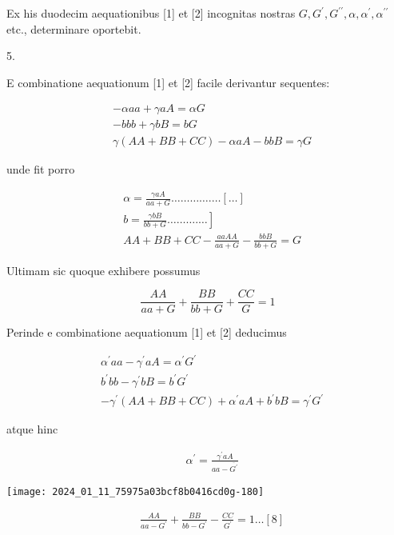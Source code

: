 \documentclass[10pt]{article}
\begin{document}
Ex his duodecim aequationibus [1] et [2] incognitas nostras \(G, G^{\prime}, G^{\prime \prime}, \alpha, \alpha^{\prime}, \alpha^{\prime \prime}\) etc., determinare oportebit.

5.

E combinatione aequationum [1] et [2] facile derivantur sequentes:

\[
\begin{aligned}
& -\alpha a a+\gamma a A=\alpha G \\
& -b b b+\gamma b B=b G \\
& \gamma(A A+B B+C C)-\alpha a A-b b B=\gamma G
\end{aligned}
\]

unde fit porro

\[
\begin{aligned}
& \alpha=\frac{\gamma a A}{a a+G} \ldots \ldots \ldots \ldots . \ldots[\ldots] \\
& \left.b=\frac{\gamma b B}{b b+G} \ldots \ldots \ldots . \ldots\right] \\
& A A+B B+C C-\frac{a a A A}{a a+G}-\frac{b b B}{b b+G}=G
\end{aligned}
\]

Ultimam sic quoque exhibere possumus

\[
\frac{A A}{a a+G}+\frac{B B}{b b+G}+\frac{C C}{G}=1
\]

Perinde e combinatione aequationum [1] et [2] deducimus

\[
\begin{aligned}
& \alpha^{\prime} a a-\gamma^{\prime} a A=\alpha^{\prime} G^{\prime} \\
& b^{\prime} b b-\gamma^{\prime} b B=b^{\prime} G^{\prime} \\
& -\gamma^{\prime}(A A+B B+C C)+\alpha^{\prime} a A+b^{\prime} b B=\gamma^{\prime} G^{\prime}
\end{aligned}
\]

atque hinc

\[
\begin{aligned}
& \alpha^{\prime}=\frac{\gamma^{\prime} a A}{a a-\overline{G^{\prime}}}
\end{aligned}
\]

\begin{center}
\texttt{[image: 2024\_01\_11\_75975a03bcf8b0416cd0g-180]}
\end{center}

\[
\begin{aligned}
& \frac{A A}{a a-G^{\prime}}+\frac{B B}{b b-G^{\prime}}-\frac{C C}{G^{\prime}}=1 \ldots[8]
\end{aligned}
\]
\end{document}
